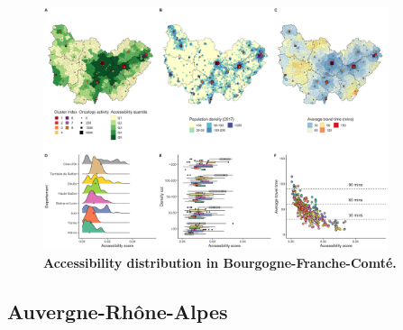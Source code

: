 \begin{figure}[H]
    \includegraphics[width=0.9\textwidth]{images/camion/region_accessibility/accessibility_Bourgogne-Franche-Comte.png}
    \centering
    \caption{
        \textbf{Accessibility distribution in Bourgogne-Franche-Comté.}
    }
\end{figure}

\subsection*{Auvergne-Rhône-Alpes}

